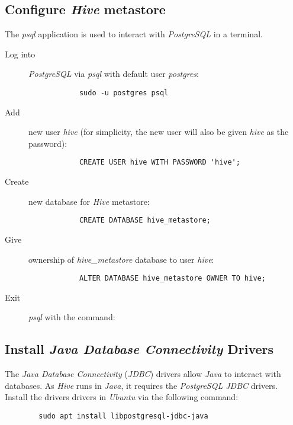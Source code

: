 \documentclass{article}
\begin{document}
    \subsection{Configure \emph{Hive} metastore}
    The \emph{psql} application is used to interact with \emph{PostgreSQL} in a terminal.
    \begin{description}
        \item[Log into] \emph{PostgreSQL} via \emph{psql} with default user \emph{postgres}:
        \begin{verbatim}
            sudo -u postgres psql 
        \end{verbatim}

        \item[Add] new user \emph{hive}
        (for simplicity, the new user will also be given \emph{hive} as the password):
        \begin{verbatim}
            CREATE USER hive WITH PASSWORD 'hive';
        \end{verbatim}

        \item[Create] new database for \emph{Hive} metastore:
        \begin{verbatim}
            CREATE DATABASE hive_metastore;
        \end{verbatim}

        \item[Give] ownership of \emph{hive\_metastore} database to user \emph{hive}:
        \begin{verbatim}
            ALTER DATABASE hive_metastore OWNER TO hive;
        \end{verbatim}

        \item[Exit] \emph{psql} with the command: \texttt{\q}
    \end{description}

    \subsection{Install \emph{Java Database Connectivity} Drivers}
    The \emph{Java Database Connectivity} (\emph{JDBC}) drivers allow \emph{Java} to interact with
    databases. As \emph{Hive} runs in \emph{Java}, it requires the \emph{PostgreSQL JDBC} drivers.
    Install the drivers drivers in \emph{Ubuntu} via the following command:
    \begin{verbatim}
        sudo apt install libpostgresql-jdbc-java
    \end{verbatim}
\end{document}
